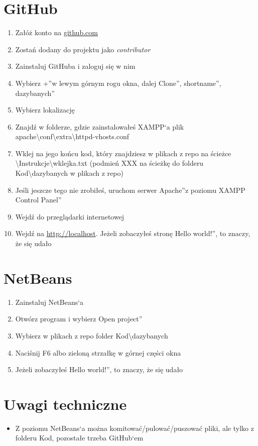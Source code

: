 \documentclass[a4paper, 11pt]{article}
\begin{document}
	\section{GitHub}
	\begin{enumerate}
		\item Załóż konto na \url{github.com}
		\item Zostań dodany do projektu jako \emph{contributor}
		\item Zainstaluj GitHuba i zaloguj się w nim
		\item Wybierz  \quotedblbase +\textquotedblright w lewym górnym rogu okna, dalej \quotedblbase Clone\textquotedblright, \quotedblbase shortname\textquotedblright, \quotedblbase dazybanych\textquotedblright
		\item Wybierz lokalizację
		\item Znajdź w folderze, gdzie zainstalowałeś XAMPP`a plik apache\textbackslash conf\textbackslash extra\textbackslash httpd-vhosts.conf
		\item Wklej na jego końcu kod, który znajdziesz w plikach z repo na ścieżce \textbackslash Instrukcje\textbackslash wklejka.txt (podmień XXX na ścieżkę do folderu Kod\textbackslash dazybanych w plikach z repo)
		\item Jeśli jeszcze tego nie zrobiłeś, uruchom serwer \quotedblbase Apache\textquotedblright z poziomu \quotedblbase XAMPP Control Panel\textquotedblright
		\item Wejdź do przeglądarki internetowej
		\item Wejdź na \url{http://localhost}. Jeżeli zobaczyłeś stronę \quotedblbase Hello world!\textquotedblright, to znaczy, że się udało
	\end{enumerate}
	\section{NetBeans}
	\begin{enumerate}
		\item Zainstaluj NetBeans`a
		\item Otwórz program i wybierz \quotedblbase Open project\textquotedblright
		\item Wybierz w plikach z repo folder Kod\textbackslash dazybanych
		\item Naciśnij F6 albo zieloną strzałkę w górnej części okna
		\item Jeżeli zobaczyłeś \quotedblbase Hello world!\textquotedblright, to znaczy, że się udało 
	\end{enumerate}
	\section{Uwagi techniczne}
	\begin{itemize}
		\item Z poziomu NetBeans`a można komitować/pulować/puszować pliki, ale tylko z folderu Kod, pozostałe trzeba GitHub`em
	\end{itemize}
\end{document}
